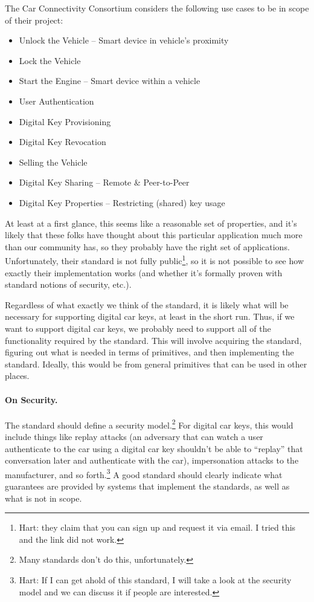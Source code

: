 The Car Connectivity Consortium considers the following use cases to be in scope of their project:
\begin{itemize}
\item Unlock the Vehicle – Smart device in vehicle’s proximity
\item Lock the Vehicle
\item Start the Engine – Smart device within a vehicle
\item User Authentication
\item Digital Key Provisioning
\item Digital Key Revocation
\item Selling the Vehicle
\item Digital Key Sharing – Remote \& Peer-to-Peer
\item Digital Key Properties – Restricting (shared) key usage
\end{itemize}

At least at a first glance, this seems like a reasonable set of properties, and it's likely that these folks have thought about this particular application much more than our community has, so they probably have the right set of applications.  Unfortunately, their standard is not fully public\footnote{Hart:  they claim that you can sign up and request it via email.  I tried this and the link did not work.}, so it is not possible to see how exactly their implementation works (and whether it's formally proven with standard notions of security, etc.).  

Regardless of what exactly we think of the standard, it is likely what will be necessary for supporting digital car keys, at least in the short run.  Thus, if we want to support digital car keys, we probably need to support all of the functionality required by the standard.  This will involve acquiring the standard, figuring out what is needed in terms of primitives, and then implementing the standard.  Ideally, this would be from general primitives that can be used in other places.

\paragraph{On Security.}  The standard should define a security model.\footnote{Many standards don't do this, unfortunately.}  For digital car keys, this would include things like replay attacks (an adversary that can watch a user authenticate to the car using a digital car key shouldn't be able to ``replay'' that conversation later and authenticate with the car), impersonation attacks to the manufacturer, and so forth.\footnote{Hart:  If I can get ahold of this standard, I will take a look at the security model and we can discuss it if people are interested.}  A good standard should clearly indicate what guarantees are provided by systems that implement the standards, as well as what is not in scope.

